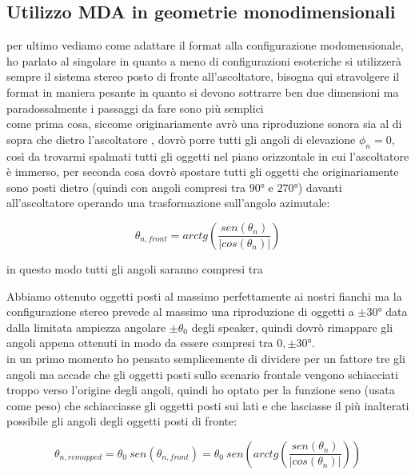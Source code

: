\documentclass[12pt,a4paper]{report}
\begin{document}
\subsection{Utilizzo MDA in geometrie monodimensionali}

per ultimo vediamo come adattare il format alla configurazione modomensionale, ho parlato al singolare in quanto a meno di configurazioni esoteriche si utilizzerà sempre il sistema stereo posto di fronte all'ascoltatore, bisogna qui stravolgere il format in maniera pesante in quanto si devono sottrarre ben due dimensioni ma paradossalmente i passaggi da fare sono più semplici\\ 

come prima cosa, siccome originariamente avrò una riproduzione sonora sia al di sopra che dietro l'ascoltatore , dovrò porre tutti gli angoli di elevazione $\phi_n=0$, così da trovarmi spalmati tutti gli oggetti nel piano orizzontale in cui l'ascoltatore è immerso, per seconda cosa dovrò spostare tutti gli oggetti che originariamente sono posti dietro (quindi con angoli compresi tra $90°$ e $270°$) davanti all'ascoltatore operando una trasformazione sull'angolo azimutale:

\begin{equation}
\theta_{n,front} = arctg  \left( \dfrac{sen(\theta_n)}{\vert cos(\theta_n)\vert } \right)
\label{llll}
\end{equation}

in questo modo tutti gli angoli saranno compresi tra %

Abbiamo ottenuto oggetti posti al massimo perfettamente ai nostri fianchi ma la configurazione stereo prevede al massimo una riproduzione di oggetti a $\pm 30°$ data dalla limitata ampiezza angolare $\pm \theta_0$ degli speaker, quindi dovrò rimappare gli angoli appena ottenuti in modo da essere compresi tra $0, \pm 30°$.\\ 

in un primo momento ho pensato semplicemente di dividere per un fattore tre gli angoli ma accade che gli oggetti posti sullo scenario frontale vengono schiacciati troppo verso l'origine degli angoli, quindi ho optato per la funzione seno (usata come peso) che schiacciasse gli oggetti posti sui lati e che lasciasse il più inalterati possibile gli angoli degli oggetti posti di fronte:

\begin{equation}
\theta_{n, remapped}= \theta_0 \ sen (\theta_{n,front}) = \theta_0 \ sen \left( arctg  \left( \dfrac{sen(\theta_n)}{\vert cos(\theta_n)\vert } \right)\right)
\label{mmmm}
\end{equation}
\end{document}
